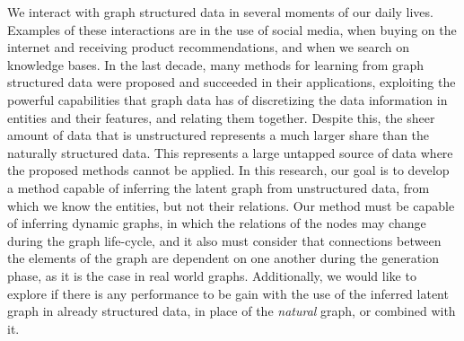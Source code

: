 We interact with graph structured data in several moments of our daily lives. Examples of these interactions are in the use of social media, when buying on the internet and receiving product recommendations, and when we search on knowledge bases. 
%
In the last decade, many methods for learning from graph structured data were proposed and succeeded in their applications, exploiting the powerful capabilities that graph data has of discretizing the data information in entities and their features, and relating them together. 
%
Despite this, the sheer amount of data that is unstructured represents a much larger share than the naturally structured data. This represents a large untapped source of data where the proposed methods cannot be applied.
%
In this research, our goal is to develop a method capable of inferring the latent graph from unstructured data, from which we know the entities, but not their relations. 
%
Our method must be capable of inferring dynamic graphs, in which the relations of the nodes may change during the graph life-cycle, and it also must consider that  connections between the elements of the graph are dependent on one another during the generation phase, as it is the case in real world graphs. 
%
Additionally, we would like to explore if there is any performance to be gain with the use of the inferred latent graph in already structured data, in place of the \emph{natural} graph, or combined with it.